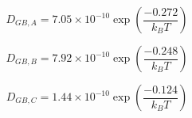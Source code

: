 \documentclass[review]{elsarticle}
\begin{document}
\begin{equation}
\label{eq:type}
D_{GB,A} = 7.05 \times 10^{-10} \exp\left(\frac{-0.272}{k_{B} T}\right)
\end{equation}

\begin{equation}
\label{eq:type1}
D_{GB,B} = 7.92 \times 10^{-10} \exp\left(\frac{-0.248}{k_{B} T}\right)
\end{equation}

\begin{equation}
\label{eq:type2}
D_{GB,C} = 1.44 \times 10^{-10} \exp\left(\frac{-0.124}{k_{B} T}\right)
\end{equation}

\end{document}
